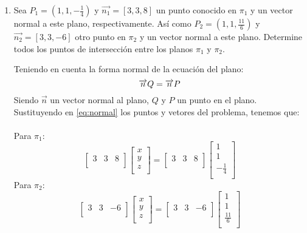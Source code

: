 \documentclass[12pt,titlepage]{article}
\begin{document}
\begin{enumerate}
\clearpage
\item 	Sea $P_{1}=(1, 1, -\frac{1}{4})$ y $\overrightarrow{n_{1}}=[3, 3,8]$ un punto conocido en $\pi_{1}$ y un vector normal a este plano, respectivamente. Así como $P_{2}=(1, 1, \frac{11}{6})$ y $\overrightarrow{n_{2}}=[3, 3, -6]$ otro punto en $\pi_{2}$ y un vector normal a este plano. Determine todos los puntos de intersección entre los planos $\pi_{1}$ y $\pi_{2}$.
\par \parskip 8mm
Teniendo en cuenta la forma normal de la ecuación del plano:
\begin{equation} \setcounter{equation}{1}
    \overrightarrow{n}Q=\overrightarrow{n}P \label{eq:normal}
\end{equation}
Siendo $\overrightarrow{n}$ un vector normal al plano, $Q$ y $P$ un punto en el plano. Sustituyendo en \eqref{eq:normal} los puntos y vetores del problema, tenemos que:\\\\
Para $\pi_{1}$:
\begin{equation} 
\left[\begin{matrix}3&3&8\\\end{matrix}\right]\left[\begin{matrix}x\\y\\z\\\end{matrix}\right]=\left[\begin{matrix}3&3&8\\\end{matrix}\right]\left[\begin{matrix}1\\1\\-\frac{1}{4}\\\end{matrix}\right]\label{eq:normal1}
\end{equation}
Para $\pi_2$:
\begin{equation}
\left[\begin{matrix}3&3&-6\\\end{matrix}\right]\left[\begin{matrix}x\\y\\z\\\end{matrix}\right]=\left[\begin{matrix}3&3&-6\\\end{matrix}\right]\left[\begin{matrix}1\\1\\\frac{11}{6}\\\end{matrix}\right]\label{eq:normal2}

\end{equation}
\end{enumerate}
\end{document}
